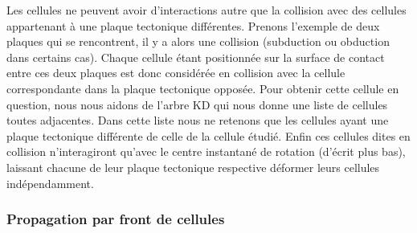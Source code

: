 \documentclass[a4paper,11pt]{article}
\begin{document}
Les cellules ne peuvent avoir d'interactions autre que la collision avec des cellules appartenant à une plaque tectonique différentes.
Prenons l'exemple de deux plaques qui se rencontrent, il y a alors une collision (subduction ou obduction dans certains cas).
Chaque cellule étant positionnée sur la surface de contact entre ces deux plaques est donc considérée en collision avec la cellule correspondante dans la plaque tectonique opposée.
Pour obtenir cette cellule en question, nous nous aidons de l'arbre KD qui nous donne une liste de cellules toutes adjacentes.
Dans cette liste nous ne retenons que les cellules ayant une plaque tectonique différente de celle de la cellule étudié.
Enfin ces cellules dites en collision n'interagiront qu'avec le centre instantané de rotation (d'écrit plus bas), laissant chacune de leur plaque tectonique respective déformer leurs cellules indépendamment.

\subsubsection{Propagation par front de cellules}
\end{document}
